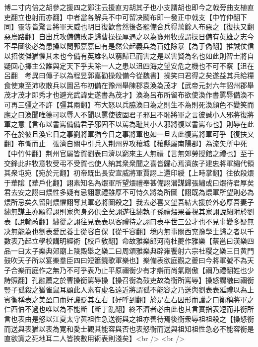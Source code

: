 博二寸内倍之胡參之援四之鄭注云援直刃胡其孑也小支謂胡也即今之戟旁曲支植直吏翻立也射而亦翻】中者當各解兵不中可留决鬭布即一發正中戟支【中竹仲翻下同】靈等皆驚言將軍天威也明日復歡會然後各罷備合兵得萬餘人布惡之【復扶又翻惡烏路翻】自出兵攻備備敗走歸曹操操厚遇之以為豫州牧或謂操日備有英雄之志今不早圖後必為患操以問郭嘉嘉曰有是然公起義兵為百姓除暴【為于偽翻】推誠仗信以招俊傑猶懼其未也今備有英雄名以窮歸已而害之是以害賢為名也如此則智士將自疑回心擇主公誰與定天下乎夫除一人之患以沮四海之望安危之機也不可不察【沮在呂翻　考異曰傳子以為程昱郭嘉勸操殺備今從魏書】操笑曰君得之矣遂益其兵給糧食使東至沛收散兵以圖呂布初備在豫州舉陳郡袁渙為茂才【武帝元封六年詔州郡舉茂才茂才即秀才也避光武諱史遂書為茂才】渙為呂布所留布欲使渙作書罵辱備渙不可再三彊之不許【彊其兩翻】布大怒以兵脇渙曰為之則生不為則死渙顔色不變笑而應之曰渙聞唯德可以辱人不聞以罵使彼固君子邪且不恥將軍之言彼誠小人邪將復將軍之意【言布以書罵備備君子邪固不以罵為耻其小人邪將復以書罵布也】則辱在此不在於彼且渙它日之事劉將軍猶今日之事將軍也如一旦去此復罵將軍可乎【復扶又翻】布慚而止　張濟自關中引兵入荆州界攻穰城【穰縣屬南陽郡】為流矢所中死【中竹仲翻】荆州官屬皆賀劉表曰濟以窮來主人無禮【言無郊勞授館之禮也】至于交鋒此非牧意牧受弔不受賀也使人納其衆衆聞之喜皆歸心焉濟族子建忠將軍繡代領其衆屯宛【宛於元翻】初帝既出長安宣威將軍賈詡上還印綬【上時掌翻】往依段煨于華隂【華戶化翻】詡素知名為煨軍所望煨禮奉甚備詡潜謀歸張繡或曰煨待君厚矣君去安之詡曰煨性多疑有忌詡意禮雖厚不可恃久將為所圖【詡既為煨軍所望則必為煨所忌矣久留則煨懼詡奪其軍必將圖殺之】我去必喜又望吾結大援於外必厚吾妻子繡無謀主亦願得詡則家與身必俱全矣詡遂往繡執子孫禮煨果善視其家詡說繡附於劉表【說輸芮翻】繡從之詡往見表表以客禮待之詡曰表平世三公才也不見事變多疑無决無能為也劉表愛民養士從容自保【從千容翻】境内無事關西兖豫學士歸之者以千數表乃起立學校講明經術【校戶敎翻】命故雅樂郎河南杜夔作雅樂【蔡邕曰漢樂四品一曰太子樂典郊廟上陵殿舉之樂二曰周頌雅樂典辟雍饗射六宗社稷之樂三日黄門鼓吹天子所以宴樂羣臣四曰短簫鐃歌軍樂也】樂備表欲庭觀之夔曰今將軍號不為天子合樂而庭作之無乃不可乎表乃止平原禰衡少有才辯而尚氣剛傲【禰乃禮翻姓也少詩照翻】孔融薦之於曹操衡罵辱操【操召衡為鼓吏故為衡所罵辱】操怒謂融曰禰衡豎子孤殺之猶雀鼠耳顧此人素有虛名遠近將謂孤不能容之乃送與劉表表延禮以為上賓衡稱表之美盈口而好譏貶其左右【好呼到翻】於是左右因形而譖之曰衡稱將軍之仁西伯不過也唯以為不能斷【斷丁亂翻】終不濟者必由此也其言實指表短而非衡所言也表由是怒以江夏太守黄祖性急送衡與之祖亦善待焉後衡衆辱祖祖殺之【操怒衡而送與表猶以表為寛和愛士觀其能容與否也表怒衡而送與祖知祖性急必不能容衡是直欲寘之死地耳二人皆挾數用術表則淺矣】<br />
<br />

